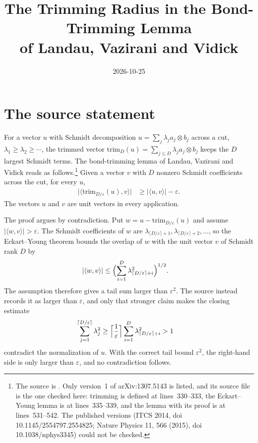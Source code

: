 \documentclass{article}
\title{The Trimming Radius in the Bond-Trimming Lemma\\
    of Landau, Vazirani and Vidick}
\author{}
\date{2026-10-25}
\begin{document}
\maketitle
{}

\section{The source statement}

For a vector $u$ with Schmidt decomposition $u=\sum_j\lambda_j a_j\otimes b_j$
across a cut, $\lambda_1\ge\lambda_2\ge\cdots$, the trimmed vector
$\mathrm{trim}_D(u)=\sum_{j\le D}\lambda_j a_j\otimes b_j$ keeps the $D$
largest Schmidt terms. The bond-trimming lemma of Landau, Vazirani and
Vidick reads as follows.\footnote{The source is
    \cite{Landau2013PolynomialTime}. Only version~1 of arXiv:1307.5143 is
    listed, and its source file  is the one checked here:
    trimming is defined at lines~330--333, the Eckart--Young lemma
     is at lines~335--339, and the lemma 
    with its proof is at lines~531--542. The published versions (ITCS 2014,
    doi 10.1145/2554797.2554825; Nature Physics 11, 566 (2015), doi
    10.1038/nphys3345) could not be checked.}
Given a vector $v$ with $D$ nonzero Schmidt coefficients across the cut, for
every $u$,
\begin{align}
    \bigl|\langle\mathrm{trim}_{D/\varepsilon}(u),v\rangle\bigr|
     & \ge|\langle u,v\rangle|-\varepsilon.
    \label{eq:lvv13_trimming_radius_printed}
\end{align}
The vectors $u$ and $v$ are unit vectors in every application.

The proof argues by contradiction. Put $w=u-\mathrm{trim}_{D/\varepsilon}(u)$
and assume $|\langle w,v\rangle|>\varepsilon$. The Schmidt coefficients of $w$
are $\lambda_{\lceil D/\varepsilon\rceil+1},\lambda_{\lceil
D/\varepsilon\rceil+2},\dots$, so the Eckart--Young theorem bounds the overlap
of $w$ with the unit vector $v$ of Schmidt rank $D$ by
\begin{align}
    |\langle w,v\rangle|
     & \le\Bigl(\sum_{i=1}^{D}\lambda_{\lceil D/\varepsilon\rceil+i}^2\Bigr)^{1/2}.
    \label{eq:lvv13_trimming_radius_eckart}
\end{align}
The assumption therefore gives a tail sum larger than $\varepsilon^2$. The
source instead records it as larger than $\varepsilon$, and only that stronger
claim makes the closing estimate
\begin{align}
    \sum_{j=1}^{\lceil D/\varepsilon\rceil}\lambda_j^2
     & \ge\Bigl\lceil\frac1\varepsilon\Bigr\rceil
    \sum_{i=1}^{D}\lambda_{\lceil D/\varepsilon\rceil+i}^2>1
    \label{eq:lvv13_trimming_radius_closing}
\end{align}
contradict the normalization of $u$. With the correct tail bound
$\varepsilon^2$, the right-hand side is only larger than $\varepsilon$, and
no contradiction follows.
\end{document}

